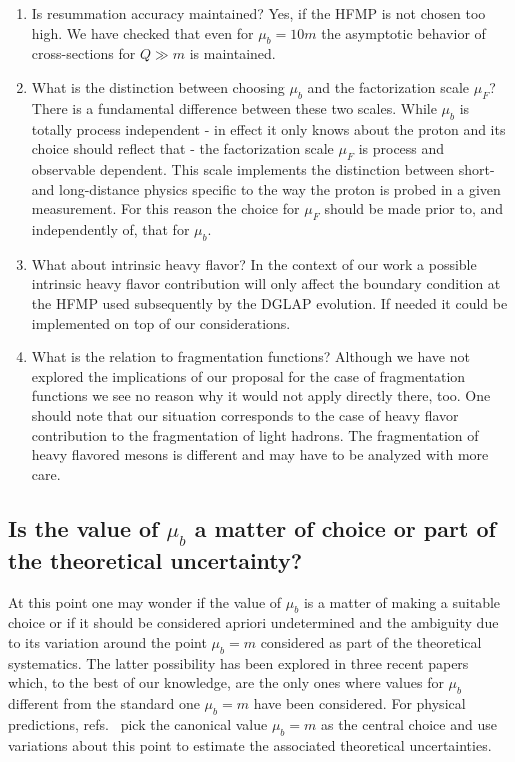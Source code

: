 \documentclass[letter,11pt]{article}
\newcommand{\muF}{\mu_F}
\def\mub{\mu_b}
\begin{document}
\begin{enumerate}
%
\item Is resummation accuracy maintained? Yes, if the HFMP is not chosen too high. We have checked that even for $\mub=10 m$ the asymptotic behavior of cross-sections for $Q\gg m$ is maintained.
%
\item What is the distinction between choosing $\mub$ and the factorization scale $\muF$? There is a fundamental difference between these two scales. While $\mub$ is totally process independent - in effect it only knows about the proton and its choice should reflect that - the factorization scale $\muF$ is process and observable dependent. This scale implements the distinction between short- and long-distance physics specific to the way the proton is probed in a given measurement. For this reason the choice for $\muF$ should be made prior to, and independently of, that for $\mub$.
%
\item What about intrinsic heavy flavor? In the context of our work a possible intrinsic heavy flavor contribution will only affect the boundary condition at the HFMP used subsequently by the DGLAP evolution. If needed it could be implemented on top of our considerations. 
%
\item What is the relation to fragmentation functions? Although we have not explored the implications of our proposal for the case of fragmentation functions we see no reason why it would not apply directly there, too. One should note that our situation corresponds to the case of heavy flavor contribution to the fragmentation of light hadrons. The fragmentation of heavy flavored mesons is different and may have to be analyzed with more care.
%
\end{enumerate}
%



\subsection{Is the value of $\mub$ a matter of choice or part of the theoretical uncertainty?}\label{sec:mubchoice}



At this point one may wonder if the value of $\mub$ is a matter of making a suitable choice or if it should be considered apriori undetermined and the ambiguity due to its variation around the point $\mub=m$ considered as part of the theoretical systematics. 
%
The latter possibility has been explored in three recent papers \cite{Bonvini:2015pxa,Bonvini:2016fgf,Bertone:2017ehk} which, to the best of our knowledge, are the only ones where values for $\mub$ different from the standard one $\mub=m$ have been considered. For physical predictions, refs.~\cite{Bonvini:2015pxa,Bonvini:2016fgf} pick the canonical value $\mub = m$ as the central choice and use variations about this point to estimate the associated theoretical uncertainties.
\end{document}

